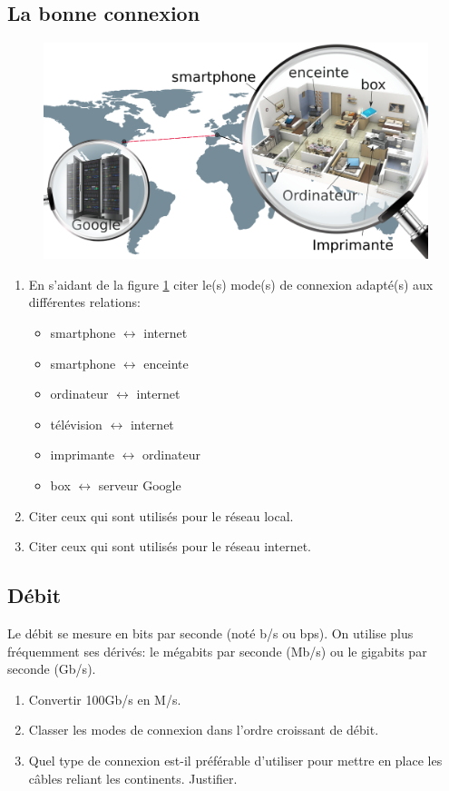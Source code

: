 \documentclass[a4paper,11pt]{article}
\begin{document}
\begin{Form}
\subsection{La bonne connexion}
\begin{figure}[!h]
\centering
\includegraphics[width=17cm]{ressources/bonne-connexion.png}
\label{connexion}
\end{figure}
\begin{activite}
\begin{enumerate}
\item En s'aidant de la figure \ref{connexion} citer le(s) mode(s) de connexion adapté(s) aux différentes relations:
\begin{itemize}
\item smartphone $\longleftrightarrow$ internet
\item smartphone $\longleftrightarrow$ enceinte
\item ordinateur $\longleftrightarrow$ internet
\item télévision $\longleftrightarrow$ internet
\item imprimante $\longleftrightarrow$ ordinateur
\item box $\longleftrightarrow$ serveur Google
\end{itemize}
\item Citer ceux qui sont utilisés pour le réseau local.
\item Citer ceux qui sont utilisés pour le réseau internet.
\end{enumerate}
\end{activite}
\subsection{Débit}
Le débit se mesure en bits par seconde (noté b/s ou bps). On utilise plus fréquemment ses dérivés: le mégabits par seconde (Mb/s) ou le gigabits par seconde (Gb/s).
\begin{activite}
\begin{enumerate}
\item Convertir 100Gb/s en M/s.
\item Classer les modes de connexion dans l'ordre croissant de débit.
\item Quel type de connexion est-il préférable d'utiliser pour mettre en place les câbles reliant les continents. Justifier.
\end{enumerate}
\end{activite}

\end{Form}
\end{document}
